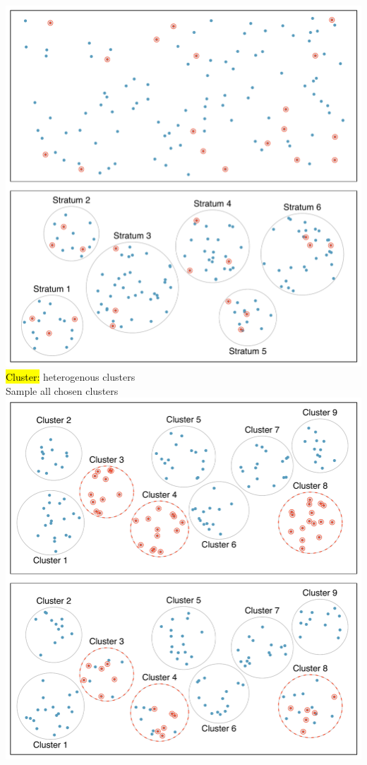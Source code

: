\documentclass[11pt,containsverbatim,handout,xcolor=xelatex,dvipsnames,table]{beamer}
\begin{document}
\begin{frame}
{\includegraphics[width=\textwidth]{figures/sampling_stratified} 
}
{
\pause
\hl{Cluster:} {\small heterogenous clusters} \\
{\small Sample all chosen clusters}
\includegraphics[width=\textwidth]{figures/sampling_cluster} \\
}
\end{frame}
\end{document}
